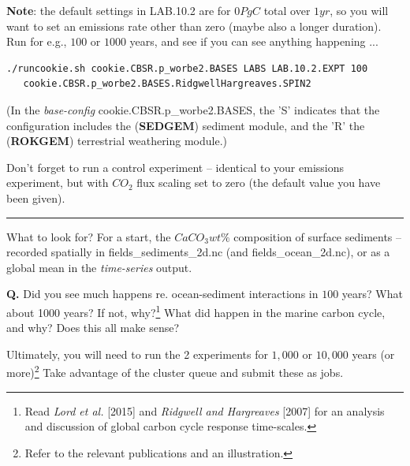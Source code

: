\vspace{1mm}
\noindent \textbf{Note}: the default settings in \textsf{\footnotesize LAB.10.2} are for $0PgC$ total over $1yr$, so you will want to set an emissions rate other than zero (maybe also a longer duration). Run for e.g., $100$ or $1000$ years, and see if you can see anything happening ...

\vspace{-1mm}\small\begin{verbatim}
./runcookie.sh cookie.CBSR.p_worbe2.BASES LABS LAB.10.2.EXPT 100 
   cookie.CBSR.p_worbe2.BASES.RidgwellHargreaves.SPIN2
\end{verbatim}\normalsize\vspace{-1mm}
(In the \textit{base-config} \textsf{\footnotesize cookie.CBSR.p\_worbe2.BASES}, the '\textsf{\footnotesize S}' indicates that the configuration includes the (\textbf{\textbf{SEDGEM}}) sediment module, and the '\textsf{\footnotesize R}' the (\textbf{ROKGEM}) terrestrial weathering module.)

\vspace{1mm}
Don't forget to run a control experiment -- identical to your emissions experiment, but with $CO_{2}$ flux scaling set to zero (the default value you have been given).

\vspace{1mm}\noindent\rule{4cm}{0.1mm}\vspace{2mm}

\noindent What to look for? For a start, the $CaCO_{3} wt\%$ composition of surface sediments -- recorded spatially in \textsf{\footnotesize fields\_sediments\_2d.nc} (and \textsf{\footnotesize fields\_ocean\_2d.nc}), or as a global mean in the \textit{time-series} output.

\vspace{1mm}
\noindent \textbf{Q.} Did you see much happens re. ocean-sediment interactions in $100$ years? What about 1000 years? If not, why?\footnote{Read \textit{Lord et al.} [2015] and \textit{Ridgwell and Hargreaves} [2007] for an analysis and discussion of global carbon cycle response time-scales.} What did happen in the marine carbon cycle, and why? Does this all make sense?

Ultimately, you will need to run the 2 experiments for $1,000$ or $10,000$ years (or more)\footnote{Refer to the relevant publications and an illustration.} Take advantage of the cluster queue and submit these as jobs.

